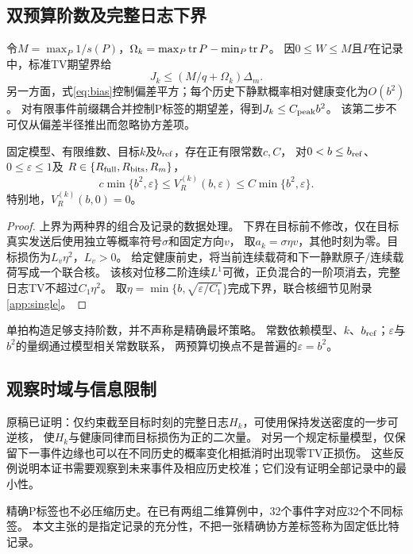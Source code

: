 \subsection{双预算阶数及完整日志下界}
令$M=\max_P1/s(P)$，$\Omega_k=\max_P\operatorname{tr} P-\min_P\operatorname{tr} P$。
因$0\le W\le M$且$P$在记录中，标准TV期望界给
\[
J_k\le(M/q+\Omega_k)\Delta_m.
\]
另一方面，式\eqref{eq:bias}控制偏差平方；每个历史下静默概率相对健康变化为$O(b^2)$。
对有限事件前缀耦合并控制P标签的期望差，得到$J_k\le C_{\rm peak}b^2$。
该第二步不可仅从偏差半径推出而忽略协方差项。

\begin{theorem}[精确反馈的有限时域损伤阶数]
\label{thm:exact}
固定模型、有限维数、目标$k$及$b_{\rm ref}$，存在正有限常数$c,C$，
对$0<b\le b_{\rm ref}$、$0\le\varepsilon\le1$及
$R\in\{R_{\rm full},R_{\rm bits},R_m\}$，
\begin{equation}
c\min\{b^2,\varepsilon\}\le V_R^{(k)}(b,\varepsilon)
\le C\min\{b^2,\varepsilon\}.
\label{eq:exact-bound}
\end{equation}
特别地，$V_R^{(k)}(b,0)=0$。
\end{theorem}
\begin{proof}
上界为两种界的组合及记录的数据处理。
下界在目标前不修改，仅在目标真实发送后使用独立等概率符号$\sigma$和固定方向$v$，
取$a_k=\sigma\eta v$，其他时刻为零。目标损伤为$L_v\eta^2$，$L_v>0$。
给定健康前史，将当前连续载荷和下一静默原子/连续载荷写成一个联合核。
该核对位移二阶连续$L^1$可微，正负混合的一阶项消去，完整日志TV不超过$C_1\eta^2$。
取$\eta=\min\{b,\sqrt{\varepsilon/C_1}\}$完成下界，联合核细节见附录\ref{app:single}。
\end{proof}
单拍构造足够支持阶数，并不声称是精确最坏策略。
常数依赖模型、$k$、$b_{\rm ref}$；$\varepsilon$与$b^2$的量纲通过模型相关常数联系，
两预算切换点不是普遍的$\varepsilon=b^2$。

\subsection{观察时域与信息限制}
原稿已证明：仅约束截至目标时刻的完整日志$H_k$，可使用保持发送密度的一步可逆核，
使$H_k$与健康同律而目标损伤为正的二次量。
对另一个规定标量模型，仅保留下一事件边缘也可以在不同历史的概率变化相抵消时出现零TV正损伤。
这些反例说明本证书需要观察到未来事件及相应历史校准；它们没有证明全部记录中的最小性。

精确P标签也不必压缩历史。在已有两组二维算例中，32个事件字对应32个不同标签。
本文主张的是指定记录的充分性，不把一张精确协方差标签称为固定低比特记录。
